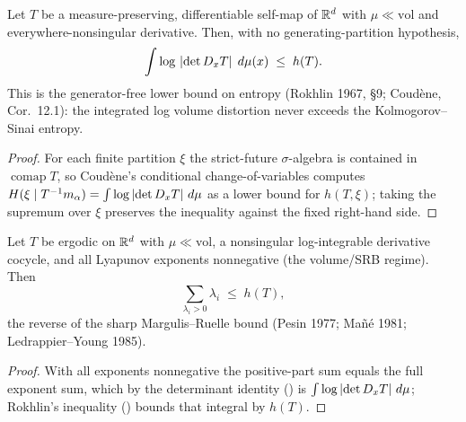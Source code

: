 \begin{theorem}\label{integral_log_abs_det_le_ksEntropy}
  \leanok
  Let \(T\) be a measure-preserving, differentiable self-map of \(\mathbb{R}^d\) with \(\mu\ll\mathrm{vol}\)
  and everywhere-nonsingular derivative. Then, with no generating-partition hypothesis,
  \[
    \int \log\,\left\lvert \det D_xT \right\rvert\;d\mu(x) \;\le\; h(T).
  \]
  This is the generator-free lower bound on entropy (Rokhlin 1967, \S9; Coud\`ene, Cor.~12.1): the
  integrated log volume distortion never exceeds the Kolmogorov--Sinai entropy.
\end{theorem}
\begin{proof}\leanok
  For each finite partition \(\xi\) the strict-future \(\sigma\)-algebra is contained in
  \(\operatorname{comap}T\), so Coud\`ene's conditional change-of-variables computes
  \(H(\xi\mid T^{-1}m_\alpha)=\int\log\left\lvert \det D_xT \right\rvert\,d\mu\) as a lower bound for \(h(T,\xi)\); taking
  the supremum over \(\xi\) preserves the inequality against the fixed right-hand side.
\end{proof}

\begin{theorem}\label{sumPosExp_le_ksEntropy_of_SRB}
  \leanok
  Let \(T\) be ergodic on \(\mathbb{R}^d\) with \(\mu\ll\mathrm{vol}\), a nonsingular log-integrable
  derivative cocycle, and all Lyapunov exponents nonnegative (the volume/SRB regime). Then
  \[
    \sum_{\lambda_i>0}\lambda_i \;\le\; h(T),
  \]
  the reverse of the sharp Margulis--Ruelle bound (Pesin 1977; Ma\~n\'e 1981; Ledrappier--Young 1985).
\end{theorem}
\begin{proof}\leanok
  With all exponents nonnegative the positive-part sum equals the full exponent sum, which by the
  determinant identity () is \(\int\log\left\lvert \det D_xT \right\rvert\,d\mu\);
  Rokhlin's inequality () bounds that integral by \(h(T)\).
\end{proof}

